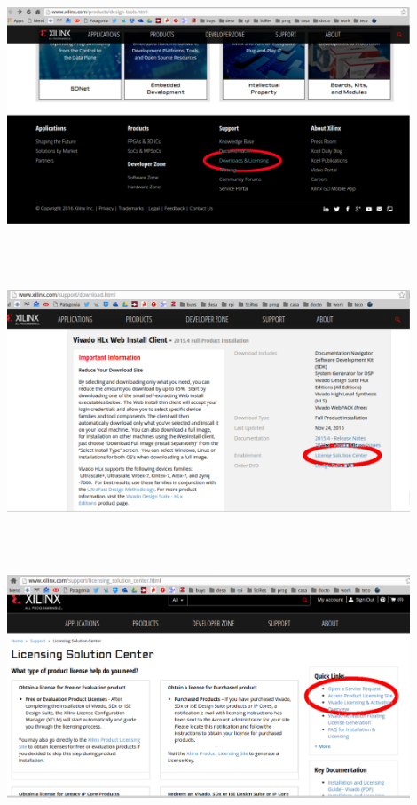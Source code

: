 \documentclass[a4paper,11pt]{article}
\begin{document}
    \begin{center}
    \includegraphics[height=8cm,width=12cm]{vivado_installer_13_bis}
    \end{center}

    \begin{center}
    \includegraphics[height=8cm,width=12cm]{vivado_installer_14}
    \end{center}

    \begin{center}
    \includegraphics[height=8cm,width=12cm]{vivado_installer_15}
    \end{center}
\end{document}
